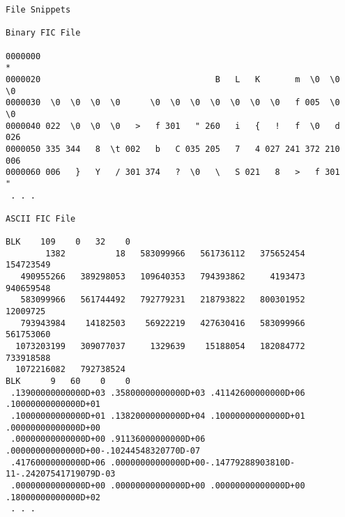 \begin{\outputsize}
\begin{verbatim}
File Snippets

Binary FIC File

0000000
*
0000020                                   B   L   K       m  \0  \0  \0
0000030  \0  \0  \0  \0      \0  \0  \0  \0  \0  \0  \0   f 005  \0  \0
0000040 022  \0  \0  \0   >   f 301   " 260   i   {   !   f  \0   d 026
0000050 335 344   8  \t 002   b   C 035 205   7   4 027 241 372 210 006
0000060 006   }   Y   / 301 374   ?  \0   \   S 021   8   >   f 301   "
 . . .

ASCII FIC File

BLK    109    0   32    0
        1382          18   583099966   561736112   375652454   154723549
   490955266   389298053   109640353   794393862     4193473   940659548
   583099966   561744492   792779231   218793822   800301952    12009725
   793943984    14182503    56922219   427630416   583099966   561753060
  1073203199   309077037     1329639    15188054   182084772   733918588
  1072216082   792738524
BLK      9   60    0    0
 .13900000000000D+03 .35800000000000D+03 .41142600000000D+06 .10000000000000D+01
 .10000000000000D+01 .13820000000000D+04 .10000000000000D+01 .00000000000000D+00
 .00000000000000D+00 .91136000000000D+06 .00000000000000D+00-.10244548320770D-07
 .41760000000000D+06 .00000000000000D+00-.14779288903810D-11-.24207541719079D-03
 .00000000000000D+00 .00000000000000D+00 .00000000000000D+00 .18000000000000D+02
 . . .
\end{verbatim}
\end{\outputsize}


%

